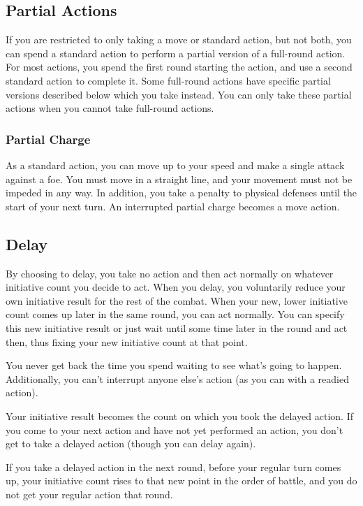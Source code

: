 \subsection{Partial Actions}

If you are restricted to only taking a move or standard action, but not both, you can spend a standard action to perform a partial version of a full-round action. For most actions, you spend the first round starting the action, and use a second standard action to complete it. Some full-round actions have specific partial versions described below which you take instead. You can only take these partial actions when you cannot take full-round actions. 

\subsubsection{Partial Charge}
As a standard action, you can move up to your speed and make a single attack against a foe. You must move in a straight line, and your movement must not be impeded in any way. In addition, you take a  penalty to physical defenses until the start of your next turn. An interrupted partial charge becomes a move action.

\subsection{Delay}\label{Delay}
By choosing to delay, you take no action and then act normally on whatever initiative count you decide to act. When you delay, you voluntarily reduce your own initiative result for the rest of the combat. When your new, lower initiative count comes up later in the same round, you can act normally. You can specify this new initiative result or just wait until some time later in the round and act then, thus fixing your new initiative count at that point.

You never get back the time you spend waiting to see what's going to happen. Additionally, you can't interrupt anyone else's action (as you can with a readied action).

 Your initiative result becomes the count on which you took the delayed action. If you come to your next action and have not yet performed an action, you don't get to take a delayed action (though you can delay again).

If you take a delayed action in the next round, before your regular turn comes up, your initiative count rises to that new point in the order of battle, and you do not get your regular action that round.

